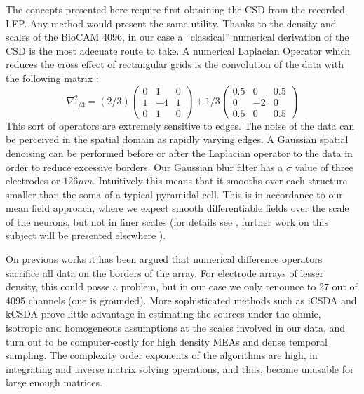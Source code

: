 \documentclass{article}
\begin{document}
The concepts presented here require first obtaining the CSD from the recorded LFP. Any method would present the same utility. Thanks to the density and scales of the BioCAM 4096, in our case a ``classical'' numerical derivation of the CSD is the most adecuate route to take. A numerical Laplacian Operator which reduces the cross effect of rectangular grids is the convolution of the data with the following matrix \cite{Lindberg90}:
\begin{equation}
\nabla^2_{1/3}=(2/3)
\begin{pmatrix}
  0 & 1 & 0 \\
  1 & -4 & 1 \\
  0 & 1 & 0
\end{pmatrix}
+1/3
\begin{pmatrix}
  0.5 & 0 & 0.5 \\
  0 & -2 & 0 \\
  0.5 & 0 & 0.5
\end{pmatrix}  
\end{equation}
This sort of operators are extremely sensitive to edges. The noise of the data can be perceived in the spatial domain as rapidly varying edges. A Gaussian spatial denoising can be performed before or after the Laplacian operator to the data in order to reduce excessive borders. Our Gaussian blur filter has a $\sigma$ value of three electrodes or $126 \mu m$. Intuitively this means that it smooths over each structure smaller than the soma of a typical pyramidal cell. 
This is  in accordance to our mean field approach, where we expect smooth differentiable fields over the scale of the neurons, but not in finer scales (for details see \cite{Bedard11}, further work on this subject will be presented elsewhere \cite{IsabelYo}).

On previous works it has been argued that numerical difference operators sacrifice all data on the borders of the array. For electrode arrays of lesser density, this could posse a problem, but in our case we only renounce to 27 out of 4095 channels (one is grounded). More sophisticated methods such as iCSDA \cite{Leski2011} and kCSDA \cite{Potworowski2011} prove little advantage in estimating the sources under the ohmic, isotropic and homogeneous assumptions at the scales involved in our data, and turn out to be computer-costly for high density MEAs and dense temporal sampling. The complexity order exponents of the algorithms are high, in integrating and inverse matrix solving operations, and thus, become unusable for large enough matrices. 
\end{document}
